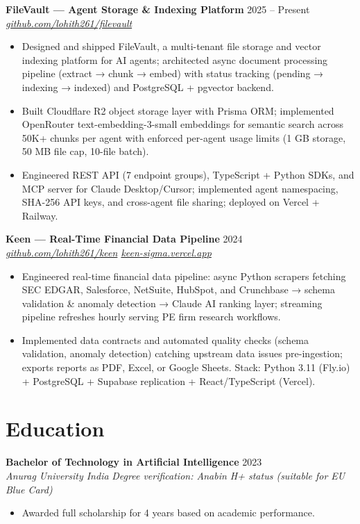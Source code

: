 \documentclass[10pt,letterpaper]{article}
\newcommand{\entry}[3]{%
  \vspace{3pt}\textbf{#1} \hfill #3 \\
  \textit{\small #2}\vspace{1pt}}
\begin{document}
\entry{FileVault --- Agent Storage \& Indexing Platform}{\href{https://github.com/lohith261/filevault}{github.com/lohith261/filevault}}{2025 -- Present}
\begin{itemize}
  \item Designed and shipped FileVault, a multi-tenant file storage and vector indexing platform for AI agents; architected async document processing pipeline (extract → chunk → embed) with status tracking (pending → indexing → indexed) and PostgreSQL + pgvector backend.
  \item Built Cloudflare R2 object storage layer with Prisma ORM; implemented OpenRouter text-embedding-3-small embeddings for semantic search across 50K+ chunks per agent with enforced per-agent usage limits (1 GB storage, 50 MB file cap, 10-file batch).
  \item Engineered REST API (7 endpoint groups), TypeScript + Python SDKs, and MCP server for Claude Desktop/Cursor; implemented agent namespacing, SHA-256 API keys, and cross-agent file sharing; deployed on Vercel + Railway.
\end{itemize}

\entry{Keen --- Real-Time Financial Data Pipeline}{\href{https://github.com/lohith261/keen}{github.com/lohith261/keen} \quad\textbullet\quad \href{https://keen-sigma.vercel.app/}{keen-sigma.vercel.app}}{2024}
\begin{itemize}
  \item Engineered real-time financial data pipeline: async Python scrapers fetching SEC EDGAR, Salesforce, NetSuite, HubSpot, and Crunchbase → schema validation \& anomaly detection → Claude AI ranking layer; streaming pipeline refreshes hourly serving PE firm research workflows.
  \item Implemented data contracts and automated quality checks (schema validation, anomaly detection) catching upstream data issues pre-ingestion; exports reports as PDF, Excel, or Google Sheets. Stack: Python 3.11 (Fly.io) + PostgreSQL + Supabase replication + React/TypeScript (Vercel).
\end{itemize}

\section{Education}

\entry{Bachelor of Technology in Artificial Intelligence}{Anurag University \textbullet{} India}{2023}
\newline\textit{\small Degree verification: Anabin H+ status (suitable for EU Blue Card)}
\begin{itemize}
  \item Awarded full scholarship for 4 years based on academic performance.
\end{itemize}
\end{document}
